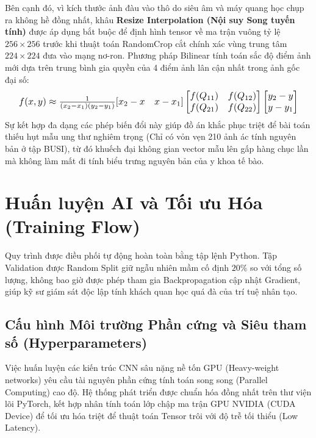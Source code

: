 \documentclass[conference,a4paper]{IEEEtran}
\begin{document}
Bên cạnh đó, vì kích thước ảnh đàu vào thô do siêu âm và máy quang học chụp ra không hề đồng nhất, khâu \textbf{Resize Interpolation (Nội suy Song tuyến tính)} được áp dụng bắt buộc để định hình tensor về ma trận vuông tỷ lệ $256 \times 256$ trước khi thuật toán RandomCrop cắt chính xác vùng trung tâm $224 \times 224$ đưa vào mạng nơ-ron. Phương pháp Bilinear tính toán sắc độ điểm ảnh mới dựa trên trung bình gia quyền của 4 điểm ảnh lân cận nhất trong ảnh gốc đại số:
\begin{equation}
\resizebox{0.95\linewidth}{!}{$
f(x,y) \approx \frac{1}{(x_2-x_1)(y_2-y_1)} [x_2-x \quad x-x_1] \begin{bmatrix} f(Q_{11}) & f(Q_{12}) \\ f(Q_{21}) & f(Q_{22}) \end{bmatrix} \begin{bmatrix} y_2-y \\ y-y_1 \end{bmatrix}
$}
\end{equation}
Sự kết hợp đa dạng các phép biến đổi này giúp đồ án khắc phục triệt để bài toán thiếu hụt mẫu ung thư nghiêm trọng (Chỉ có vỏn vẹn 210 ảnh ác tính nguyên bản ở tập BUSI), từ đó khuếch đại không gian vector mẫu lên gấp hàng chục lần mà không làm mất đi tính biểu trưng nguyên bản của y khoa tế bào.
\section{Huấn luyện AI và Tối ưu Hóa (Training Flow)}
Quy trình được điều phối tự động hoàn toàn bằng tập lệnh Python. Tập Validation được Random Split giữ ngẫu nhiên mầm cố định $20\%$ so với tổng số lượng, không bao giờ được phép tham gia Backpropagation cập nhật Gradient, giúp kỹ sư giám sát độc lập tính khách quan học quá đà của trí tuệ nhân tạo.

\subsection{Cấu hình Môi trường Phần cứng và Siêu tham số (Hyperparameters)}
Việc huấn luyện các kiến trúc CNN sâu nặng nề tốn GPU (Heavy-weight networks) yêu cầu tài nguyên phần cứng tính toán song song (Parallel Computing) cao độ. Hệ thống phát triển được chuẩn hóa đồng nhất trên thư viện lõi PyTorch, kết hợp nhân tính toán lớp chập ma trận GPU NVIDIA (CUDA Device) để tối ưu hóa triệt để thuật toán Tensor trôi với độ trễ tối thiểu (Low Latency).
\end{document}
